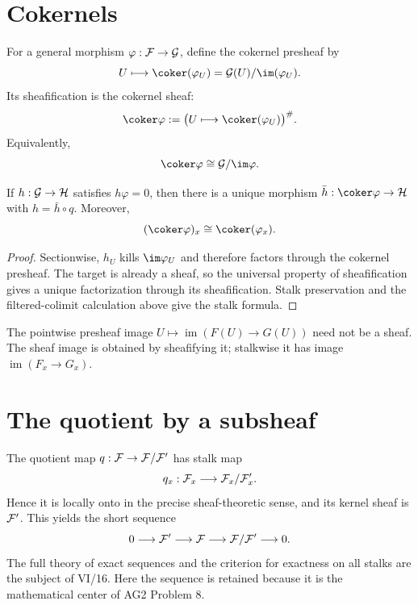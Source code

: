 

\section{Cokernels}

For a general morphism $\varphi:\mathcal F\to\mathcal G$, define the cokernel presheaf by
\[
U\longmapsto\coker(\varphi_U)=\G(U)/\im(\varphi_U).
\]
Its sheafification is the cokernel sheaf:
\[
\coker\varphi:=
\bigl(U\longmapsto\coker(\varphi_U)\bigr)^\#.
\]
Equivalently,
\[
\coker\varphi\cong\G/\im\varphi.
\]

\begin{theorem}
If $h:\mathcal G\to\mathcal H$ satisfies $h\varphi=0$, then there is a unique morphism
$\bar h:\coker\varphi\to\Hcal$ with $h=\bar h\circ q$.  Moreover,
\[
(\coker\varphi)_x\cong\coker(\varphi_x).
\]
\end{theorem}
\begin{proof}
Sectionwise, $h_U$ kills $\im\varphi_U$ and therefore factors through the cokernel presheaf.
The target is already a sheaf, so the universal property of sheafification gives a unique
factorization through its sheafification.  Stalk preservation and the filtered-colimit
calculation above give the stalk formula.
\end{proof}



\begin{example}\label{ex:vi15-expand-02}
The pointwise presheaf image $U\mapsto\operatorname{im}(F(U)\to G(U))$ need not be a sheaf.  The sheaf image is obtained by sheafifying it; stalkwise it has image $\operatorname{im}(F_x\to G_x)$.
\end{example}
\section{The quotient by a subsheaf}

The quotient map $q:\mathcal F\to\mathcal F/\mathcal F'$ has stalk map
\[
q_x:\mathcal F_x\longrightarrow\mathcal F_x/\mathcal F'_x.
\]
Hence it is locally onto in the precise sheaf-theoretic sense, and its kernel sheaf is
$\mathcal F'$.  This yields the short sequence
\[
0\longrightarrow\mathcal F'\longrightarrow\mathcal F\longrightarrow\mathcal F/\mathcal F'\longrightarrow0.
\]
The full theory of exact sequences and the criterion for exactness on all stalks are the
subject of VI/16.  Here the sequence is retained because it is the mathematical center of
AG2 Problem 8.

